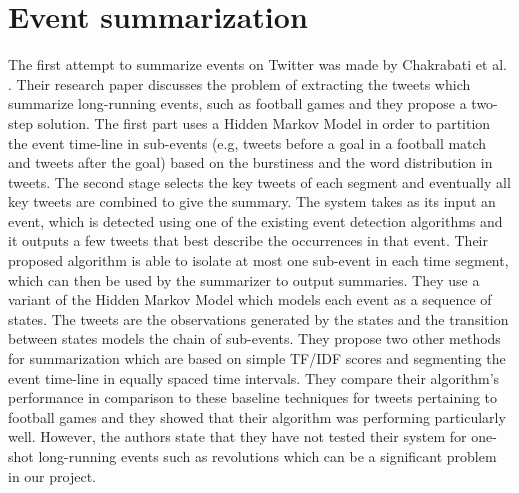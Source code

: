 \section{Event summarization}\label{sec:EventSummarizationBack}
The first attempt to summarize events on Twitter was made by Chakrabati et al. \citep{Chakrabarti_Punera_2011}. Their research paper discusses the problem of extracting the tweets which summarize long-running events, such as football games and they propose a two-step solution. The first part uses a Hidden Markov Model in order to partition the event time-line in sub-events (e.g, tweets before a goal in a football match and tweets after the goal) based on the burstiness and the word distribution in tweets. The second stage selects the key tweets of each segment and eventually all key tweets are combined to give the summary. The system takes as its input an event, which is detected using one of the existing event detection algorithms and it outputs a few tweets that best describe the occurrences in that event. Their proposed algorithm is able to isolate at most one sub-event in each time segment, which can then be used by the summarizer to output summaries. They use a variant of the Hidden Markov Model which models each event as a sequence of states. The tweets are the observations generated by the states and the transition between states models the chain of sub-events. They propose two other methods for summarization which are based on simple TF/IDF scores and segmenting the event time-line in equally spaced time intervals. They compare their algorithm’s performance in comparison to these baseline techniques for tweets pertaining to football games and they showed that their algorithm was performing particularly well. However, the authors state that they have not tested their system for one-shot long-running events such as revolutions which can be a significant problem in our project. \\\\
